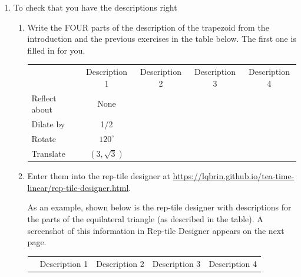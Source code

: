 \begin{enumerate}
    \wbvfill
    \item To check that you have the descriptions right
    \begin{enumerate}
		\item Write the FOUR parts of the description of the trapezoid from the introduction and the previous exercises in the table below. The first one is filled in for you.\par
			\setlength{\extrarowheight}{20pt}
			\begin{tabular}{l|c|c|c|c|}
			\multicolumn{1}{l}{} & \multicolumn{1}{c}{Description 1} & \multicolumn{1}{c}{Description 2} & \multicolumn{1}{c}{Description 3} & \multicolumn{1}{c}{Description 4}\tabularnewline
			\cline{2-5} \cline{3-5} \cline{4-5} \cline{5-5} 
			Reflect about & None &  &  & \tabularnewline
			\cline{2-5} \cline{3-5} \cline{4-5} \cline{5-5} 
			Dilate by & 1/2 &  &  & \tabularnewline
			\cline{2-5} \cline{3-5} \cline{4-5} \cline{5-5} 
			Rotate & $120^\circ$ &  &  & \tabularnewline
			\cline{2-5} \cline{3-5} \cline{4-5} \cline{5-5} 
			Translate & $(3,\sqrt 3)$ &  &  & \tabularnewline
			\cline{2-5} \cline{3-5} \cline{4-5} \cline{5-5} 
			\end{tabular}
			\setlength{\extrarowheight}{0pt}
		\item Enter them into the rep-tile designer at \hyperlink{https://lqbrin.github.io/tea-time-linear/rep-tile-designer.html}{https://lqbrin.github.io/tea-time-linear/rep-tile-designer.html}. \par \bigskip\noindent As an example, shown below is the rep-tile designer with descriptions for the parts of the equilateral triangle (as described in the table). A screenshot of this information in Rep-tile Designer appears on the next page.\par
			\begin{tabular}{l|c|c|c|c|}
			\multicolumn{1}{l}{} & \multicolumn{1}{c}{Description 1} & \multicolumn{1}{c}{Description 2} & \multicolumn{1}{c}{Description 3} & \multicolumn{1}{c}{Description 4}\tabularnewline
			\cline{2-5} \cline{3-5} \cline{4-5} \cline{5-5} 

\end{tabular}
\end{enumerate}
\end{enumerate}
